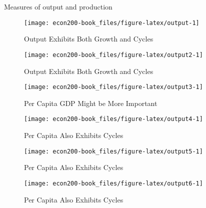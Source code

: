 \documentclass[
]{book}
\begin{document}
Measures of output and production

\begin{figure}

{\centering \texttt{[image: econ200-book\_files/figure-latex/output-1]} 

}

\caption{Output Exhibits Both Growth and Cycles}\label{fig:output}
\end{figure}

\begin{figure}

{\centering \texttt{[image: econ200-book\_files/figure-latex/output2-1]} 

}

\caption{Output Exhibits Both Growth and Cycles}\label{fig:output2}
\end{figure}

\begin{figure}

{\centering \texttt{[image: econ200-book\_files/figure-latex/output3-1]} 

}

\caption{Per Capita GDP Might be More Important}\label{fig:output3}
\end{figure}

\begin{figure}

{\centering \texttt{[image: econ200-book\_files/figure-latex/output4-1]} 

}

\caption{Per Capita Also Exhibits Cycles}\label{fig:output4}
\end{figure}

\begin{figure}

{\centering \texttt{[image: econ200-book\_files/figure-latex/output5-1]} 

}

\caption{Per Capita Also Exhibits Cycles}\label{fig:output5}
\end{figure}

\begin{figure}

{\centering \texttt{[image: econ200-book\_files/figure-latex/output6-1]} 

}

\caption{Per Capita Also Exhibits Cycles}\label{fig:output6}
\end{figure}

  
\end{document}
